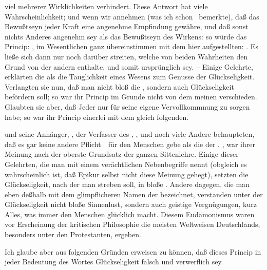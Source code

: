 viel mehrerer  Wirklichkeiten verhindert. Diese Antwort hat viele Wahrscheinlichkeit; und wenn wir annehmen (was ich schon \ bemerkte), daß das Bewußtseyn jeder Kraft eine angenehme Empfindung gewähre, und daß sonst nichts Anderes angenehm sey als das Bewußtseyn des Wirkens: so würde das Princip: , im Wesentlichen ganz übereinstimmen mit dem hier aufgestellten: . Es ließe sich dann nur noch darüber streiten, welche von beiden Wahrheiten den Grund von der andern enthalte, und somit ursprünglich sey. -- Einige Gelehrte, \zB\  erklärten die  als die Tauglichkeit eines Wesens zum Genusse der Glückseligkeit. Verlangten sie nun, daß man nicht bloß die , sondern auch  Glückseligkeit befördern soll; so war ihr Princip im Grunde nicht von dem meinen verschieden. Glaubten sie aber, daß Jeder nur für seine eigene Vervollkommnung zu sorgen habe; so war ihr Princip einerlei mit dem gleich folgenden.
\begin{aufza}\setcounter{enumi}{14}
\item {} und seine Anhänger, , der Verfasser des , , und noch viele Andere behaupteten, daß es gar keine andere Pflicht~\ für den Menschen gebe als die der . , war ihrer Meinung nach der oberste Grundsatz der ganzen Sittenlehre. Einige dieser Gelehrten, die man mit einem verächtlichen Nebenbegriffe  nennt (obgleich es wahrscheinlich ist, daß Epikur selbst nicht diese Meinung gehegt), setzten die Glückseligkeit, nach der man streben soll, in bloße . Andere dagegen, die man eben deßhalb mit dem glimpflicheren Namen der  bezeichnet, verstanden unter der Glückseligkeit nicht bloße Sinnenlust, sondern auch geistige Vergnügungen, kurz Alles, was immer den Menschen glücklich macht. Diesem Eudämonismus waren vor Erscheinung der kritischen Philosophie die meisten Weltweisen Deutschlands, besonders unter den Protestanten, ergeben.
\end{aufza}\par
Ich glaube aber aus folgenden Gründen erweisen zu können, daß dieses Princip in jeder Bedeutung des Wortes Glückseligkeit falsch und verwerflich sey.
